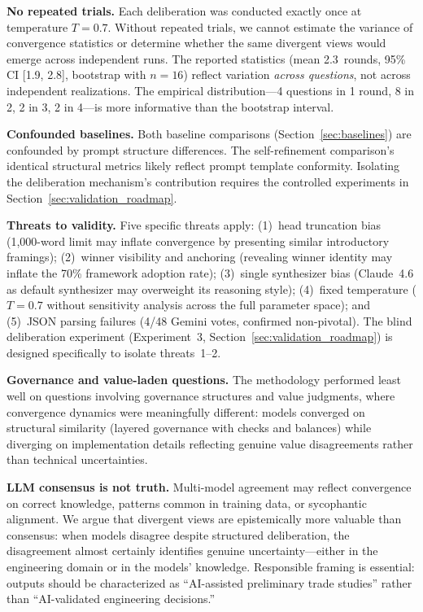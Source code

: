 \documentclass[11pt,a4paper]{article}
\begin{document}
\textbf{No repeated trials.} Each deliberation was conducted exactly once at temperature $T = 0.7$. Without repeated trials, we cannot estimate the variance of convergence statistics or determine whether the same divergent views would emerge across independent runs. The reported statistics (mean 2.3~rounds, 95\% CI [1.9, 2.8], bootstrap with $n=16$) reflect variation \emph{across questions}, not across independent realizations. The empirical distribution---4 questions in 1 round, 8 in 2, 2 in 3, 2 in 4---is more informative than the bootstrap interval.

\textbf{Confounded baselines.} Both baseline comparisons (Section~\ref{sec:baselines}) are confounded by prompt structure differences. The self-refinement comparison's identical structural metrics likely reflect prompt template conformity. Isolating the deliberation mechanism's contribution requires the controlled experiments in Section~\ref{sec:validation_roadmap}.

\textbf{Threats to validity.} Five specific threats apply: (1)~head truncation bias (1{,}000-word limit may inflate convergence by presenting similar introductory framings); (2)~winner visibility and anchoring (revealing winner identity may inflate the 70\% framework adoption rate); (3)~single synthesizer bias (Claude~4.6 as default synthesizer may overweight its reasoning style); (4)~fixed temperature ($T = 0.7$ without sensitivity analysis across the full parameter space); and (5)~JSON parsing failures (4/48 Gemini votes, confirmed non-pivotal). The blind deliberation experiment (Experiment~3, Section~\ref{sec:validation_roadmap}) is designed specifically to isolate threats~1--2.

\textbf{Governance and value-laden questions.} The methodology performed least well on questions involving governance structures and value judgments, where convergence dynamics were meaningfully different: models converged on structural similarity (layered governance with checks and balances) while diverging on implementation details reflecting genuine value disagreements rather than technical uncertainties.

\textbf{LLM consensus is not truth.} Multi-model agreement may reflect convergence on correct knowledge, patterns common in training data, or sycophantic alignment. We argue that divergent views are epistemically more valuable than consensus: when models disagree despite structured deliberation, the disagreement almost certainly identifies genuine uncertainty---either in the engineering domain or in the models' knowledge. Responsible framing is essential: outputs should be characterized as ``AI-assisted preliminary trade studies'' rather than ``AI-validated engineering decisions.''
\end{document}
